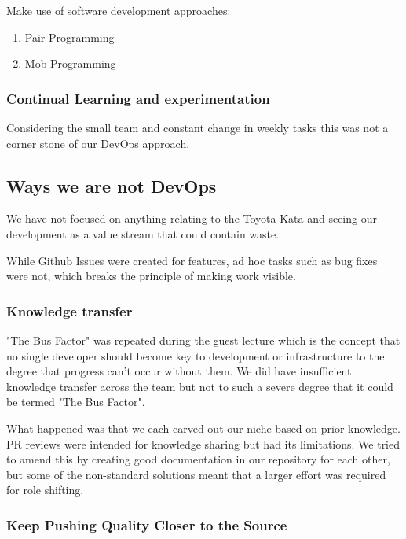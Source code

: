 \documentclass{article}
\begin{document}
Make use of software development approaches:

\begin{enumerate}
    \item Pair-Programming
    \item Mob Programming
\end{enumerate}

\subsubsection{Continual Learning and experimentation}

Considering the small team and constant change in weekly tasks this was not a corner stone of our DevOps approach. 

\subsection{Ways we are not DevOps}

We have not focused on anything relating to the Toyota Kata and seeing our development as a value stream that could contain waste. 

While Github Issues were created for features, ad hoc tasks such as bug fixes were not, which breaks the principle of making work visible. 

\subsubsection{Knowledge transfer}

"The Bus Factor" was repeated during the guest lecture which is the concept that no single developer should become key to development or infrastructure to the degree that progress can't occur without them. We did have insufficient knowledge transfer across the team but not to such a severe degree that it could be termed "The Bus Factor".

What happened was that we each carved out our niche based on prior knowledge. PR reviews were intended for knowledge sharing but had its limitations. We tried to amend this by creating good documentation in our repository for each other, but some of the non-standard solutions meant that a larger effort was required for role shifting.  

\subsubsection{Keep Pushing Quality Closer to the Source}
\end{document}
